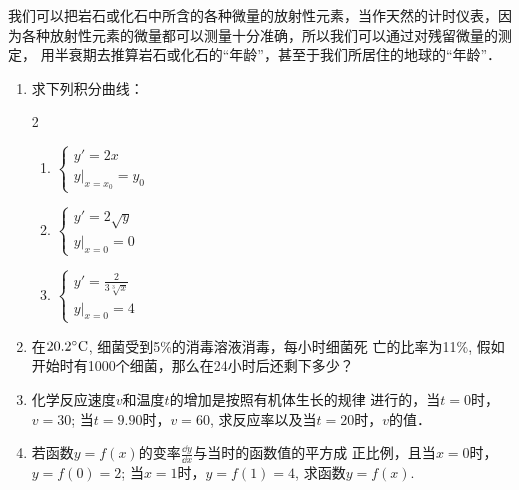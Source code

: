 我们可以把岩石或化石中所含的各种微量的放射性元素，当作天然的计时仪表，因为各种放射性元素的微量都可以测量十分准确，所以我们可以通过对残留微量的测定，
用半衰期去推算岩石或化石的“年龄”，甚至于我们所居住的地球的“年龄”．

\begin{ex}
\begin{enumerate}
    \item 求下列积分曲线：
\begin{multicols}{2}
\begin{enumerate}
    \item $\begin{cases}
        y'=2x\\
        y|_{x=x_0}=y_0
    \end{cases}$
    \item $\begin{cases}
        y'=2\sqrt{y}\\
        y|_{x=0}=0
    \end{cases}$
    \item $\begin{cases}
        y'=\frac{2}{3\sqrt[3]{x}}\\
        y|_{x=0}=4
    \end{cases}$
\end{enumerate}
\end{multicols}
\item 在$20.2^{\circ}{\rm C}$, 细菌受到5\%的消毒溶液消毒，每小时细菌死
    亡的比率为11\%, 假如开始时有1000个细菌，那么在24小时后还剩下多少？
    \item 化学反应速度$v$和温度$t$的增加是按照有机体生长的规律
    进行的，当$t=0$时，$v=30$; 当$t=9.90$时，$v=60$, 求反应率以及当$t=20$时，$v$的值．
\item 若函数$y=f(x)$的变率$\frac{\dd y}{\dd x}$与当时的函数值的平方成
    正比例，且当$x=0$时，$y=f(0)=2$; 当$x=1$时，$y=f(1)=4$, 求函数$y=f(x)$.
\end{enumerate} 
\end{ex}

